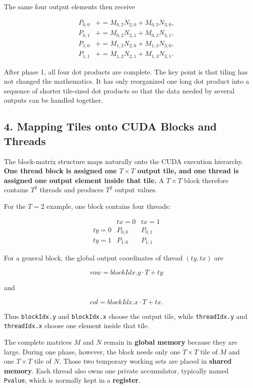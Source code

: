 \documentclass[11pt,a4paper]{article}
\begin{document}
The same four output elements then receive

\[
\begin{aligned}
P_{0,0}
&\mathrel{+}=M_{0,2}N_{2,0}+M_{0,3}N_{3,0},
\\
P_{0,1}
&\mathrel{+}=M_{0,2}N_{2,1}+M_{0,3}N_{3,1},
\\
P_{1,0}
&\mathrel{+}=M_{1,2}N_{2,0}+M_{1,3}N_{3,0},
\\
P_{1,1}
&\mathrel{+}=M_{1,2}N_{2,1}+M_{1,3}N_{3,1}.
\end{aligned}
\]

After phase 1, all four dot products are complete. The key point is that tiling has not changed the mathematics. It has only reorganized one long dot product into a sequence of shorter tile-sized dot products so that the data needed by several outputs can be handled together.

\subsection{4. Mapping Tiles onto CUDA Blocks and Threads}

The block-matrix structure maps naturally onto the CUDA execution hierarchy. \textbf{One thread block is assigned one $T\times T$ output tile, and one thread is assigned one output element inside that tile.} A $T\times T$ block therefore contains $T^2$ threads and produces $T^2$ output values.

For the $T=2$ example, one block contains four threads:

\[
\begin{array}{c|cc}
& tx=0 & tx=1 \\
\hline
 ty=0 & P_{0,0} & P_{0,1} \\
 ty=1 & P_{1,0} & P_{1,1}
\end{array}
\]

For a general block, the global output coordinates of thread $(ty,tx)$ are

\[
\boxed{
row = blockIdx.y\cdot T + ty
}
\]

and

\[
\boxed{
col = blockIdx.x\cdot T + tx.
}
\]

Thus \texttt{blockIdx.y} and \texttt{blockIdx.x} choose the output tile, while \texttt{threadIdx.y} and \texttt{threadIdx.x} choose one element inside that tile.

The complete matrices $M$ and $N$ remain in \textbf{global memory} because they are large. During one phase, however, the block needs only one $T\times T$ tile of $M$ and one $T\times T$ tile of $N$. Those two temporary working sets are placed in \textbf{shared memory}. Each thread also owns one private accumulator, typically named \texttt{Pvalue}, which is normally kept in a \textbf{register}.
\end{document}
